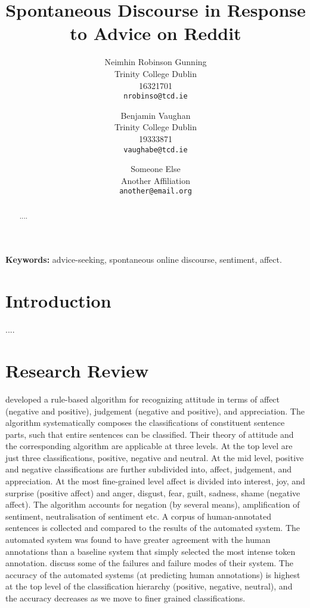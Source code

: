 \documentclass[a4paper,11pt]{article}
\title{Spontaneous Discourse in Response to Advice on Reddit}
\date{}
\author{Neimhin Robinson Gunning\\
       Trinity College Dublin\\
       16321701\\
       \texttt{nrobinso@tcd.ie}
  \and Benjamin Vaughan\\
      Trinity College Dublin\\
      19333871\\
      \texttt{vaughabe@tcd.ie}
  \and Someone Else\\
       Another Affiliation\\
       \texttt{another@email.org}
}
\begin{document}
\maketitle
\begin{abstract}
....
\end{abstract}

\textbf{Keywords:}
  advice-seeking,
  spontaneous online discourse,
  sentiment,
  affect.
\thispagestyle{empty}
\pagestyle{empty}

\section{Introduction}

....

\section{Research Review}

\cite{alfandre-2009}

\cite{brookes-2016}

\cite{smailhodzic-2016}

\cite{neviarouskaya-2010} developed a rule-based algorithm for recognizing attitude in terms of affect (negative and positive), judgement (negative and positive), and appreciation.
The algorithm systematically composes the classifications of constituent sentence parts, such that entire sentences can be classified. Their theory of attitude and the corresponding algorithm are applicable at three levels.
At the top level are just three classifications, positive, negative and neutral.
At the mid level, positive and negative classifications are further subdivided into, affect, judgement, and appreciation.
At the most fine-grained level affect is divided into interest, joy, and surprise (positive affect) and anger, disgust, fear, guilt, sadness, shame (negative affect).
The algorithm accounts for negation (by several means), amplification of sentiment, neutralisation of sentiment etc.
A corpus of human-annotated sentences is collected and compared to the results of the automated system.
The automated system was found to have greater agreement with the human annotations than a baseline system that simply selected the most intense token annotation.
\cite{neviarouskaya-2010} discuss some of the failures and failure modes of their system.
The accuracy of the automated systems (at predicting human annotations) is highest at the top level of the classification hierarchy (positive, negative, neutral), and the accuracy decreases as we move to finer grained classifications.
\end{document}
